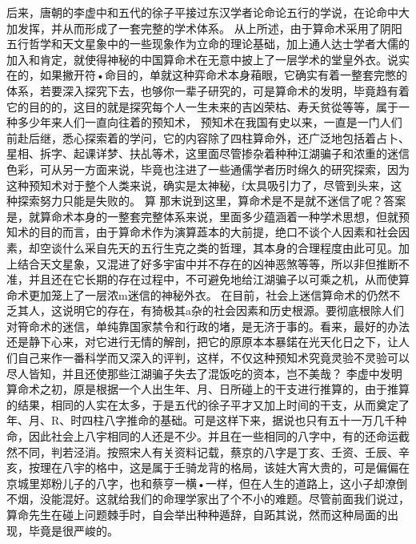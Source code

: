 {{后来，唐朝的李虚中和五代的徐子平接过东汉学者论命论五行的学说，在论命中大加发挥，并从而形成了一套完整的学术体系。
从上所述，由于算命术采用了阴阳五行哲学和天文星象中的一些现象作为立命的理论基础，加上通人达士学者大儒的加入和肯定，就使得神秘的中国算命术在无意中披上了一层学术的堂皇外衣。说实在的，如果撇开符•命目的，单就这种弈命术本身葙眼，它确实有着一整套完憋的体系，若要深入探究下去，也够你一辈子研究的，可是算命术的发明，毕竟趋有着它的目的的，这目的就是探究每个人一生未来的吉凶荣枯、寿夭贫從等等，属于一种多少年来人们一直向往着的预知术，
预知术在我国有史以来，一直是一门人们前赴后继，悉心探索着的学问，它的内容除了四柱算命外，还广泛地包括着占卜、星相、拆字、起课详梦、扶乩等术，这里面尽管掺杂着种种江湖骗子和浓重的迷信色彩，可从另一方面来说，毕竟也注进了一些通儒学者历时绵久的研究探索，因为这种预知术对于整个人类来说，确实是太神秘，f太具吸引力了，尽管到头来，这种探索努力只能是失败的。
算
那末说到这里，算命术是不是就不迷信了呢？答案是，就算命术本身的一整套完整体系来说，里面多少蕴涵着一种学术思想，但就预知术的目的而言，由于算命术作为演算蕋本的大前提，绝口不谈个人因素和社会因素，却空谈什么采自先天的五行生克之类的哲理，其本身的合理程度由此可见。加上结合天文星象，又混进了好多宇宙中并不存在的凶神恶煞等等，所以非但推断不准，并且还在它长期的存在过程中，不可避免地给江湖骗子以可乘之机，从而使算命术更加笼上了一层浓m迷信的神秘外衣。
在目前，社会上迷信算命术的仍然不乏其人，这说明它的存在，有猗极其a杂的社会因素和历史根源。要彻底根除人们对筲命术的迷信，单纯靠国家禁令和行政的堵，是无济于事的。看来，最好的办法还是静下心来，对它进行无情的解剖，把它的原原本本暴鍩在光天化日之下，让人们自己来作一番科学而又深入的评判，这样，不仅这种预知术究竟灵验不灵验可以尽人皆知，并且还使那些江湖骗子失去了混饭吃的资本，岂不美哉？
李虚中发明算命术之初，原是根据一个人出生年、月、日所碰上的干支进行推算的，由于推算的结果，相同的人实在太多，于是五代的徐子平才又加上时间的干支，从而奠定了年、月、R、时四柱八字推命的基础。可是这样下来，据说也只有五十一万几千种命，因此社会上八宇相同的人还是不少。并且在一些相同的八字中，有的还命运截然不同，判若泾消。按照宋人有关资料记载，蔡京的八字是丁亥、壬资、壬辰、辛亥，按理在八宇的格中，这是属于壬骑龙背的格局，该娃大宵大贵的，可是偏偏在京城里郑粉儿子的八字，也和蔡亨一横•一样，但在人生的道路上，这小子却潦倒不烟，没能混好。这就给我们的命理学家出了个不小的难题。尽管前面我们说过，算命先生在碰上问题棘手时，自会举出种种遁辞，自跖其说，然而这种局面的出现，毕竟是很严峻的。

}}
